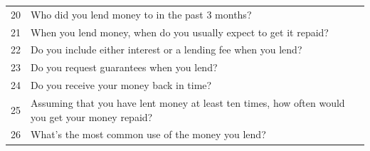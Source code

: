 \begin{longtable}[]{@{}ll@{}}
\begin{minipage}[t]{0.05\columnwidth}\raggedright
20\strut
\end{minipage} & \begin{minipage}[t]{0.89\columnwidth}\raggedright
Who did you lend money to in the past 3 months?\strut
\end{minipage}\tabularnewline
\begin{minipage}[t]{0.05\columnwidth}\raggedright
21\strut
\end{minipage} & \begin{minipage}[t]{0.89\columnwidth}\raggedright
When you lend money, when do you usually expect to get it repaid?\strut
\end{minipage}\tabularnewline
\begin{minipage}[t]{0.05\columnwidth}\raggedright
22\strut
\end{minipage} & \begin{minipage}[t]{0.89\columnwidth}\raggedright
Do you include either interest or a lending fee when you lend?\strut
\end{minipage}\tabularnewline
\begin{minipage}[t]{0.05\columnwidth}\raggedright
23\strut
\end{minipage} & \begin{minipage}[t]{0.89\columnwidth}\raggedright
Do you request guarantees when you lend?\strut
\end{minipage}\tabularnewline
\begin{minipage}[t]{0.05\columnwidth}\raggedright
24\strut
\end{minipage} & \begin{minipage}[t]{0.89\columnwidth}\raggedright
Do you receive your money back in time?\strut
\end{minipage}\tabularnewline
\begin{minipage}[t]{0.05\columnwidth}\raggedright
25\strut
\end{minipage} & \begin{minipage}[t]{0.89\columnwidth}\raggedright
Assuming that you have lent money at least ten times, how often would
you get your money repaid?\strut
\end{minipage}\tabularnewline
\begin{minipage}[t]{0.05\columnwidth}\raggedright
26\strut
\end{minipage} & \begin{minipage}[t]{0.89\columnwidth}\raggedright
What's the most common use of the money you lend?\strut
\end{minipage}\tabularnewline

\end{longtable}

